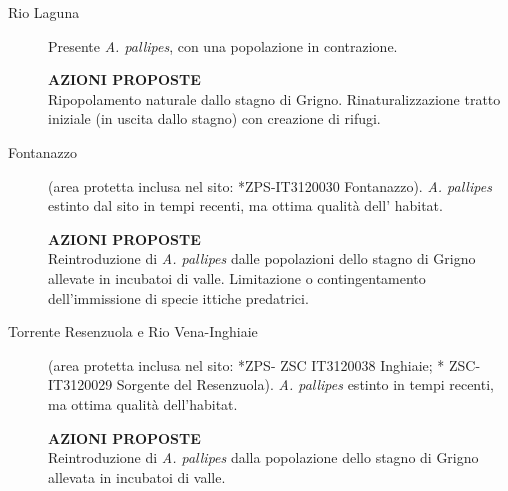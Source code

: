 \documentclass[11pt,a4paper,italian,twoside,openany]{memoir}
\begin{document}
\begin{description}
\item[Rio Laguna] Presente \emph{A. pallipes}, con una popolazione in contrazione.

\textbf{AZIONI PROPOSTE}\\

Ripopolamento naturale dallo stagno di Grigno. Rinaturalizzazione tratto iniziale (in uscita dallo stagno) con creazione di rifugi.

\item[Fontanazzo] (area protetta inclusa nel sito: *ZPS-IT3120030 Fontanazzo). \emph{A. pallipes} estinto dal sito in tempi recenti, ma ottima qualità dell' habitat.

\textbf{AZIONI PROPOSTE}\\

Reintroduzione di \emph{A. pallipes} dalle popolazioni dello stagno di Grigno allevate in incubatoi di valle. Limitazione o contingentamento dell'immissione di specie ittiche predatrici.

\item[Torrente Resenzuola e Rio Vena-Inghiaie] (area protetta inclusa nel sito: *ZPS- ZSC IT3120038 Inghiaie; * ZSC- IT3120029 Sorgente del Resenzuola). \emph{A. pallipes} estinto in tempi recenti, ma ottima qualità dell'habitat.

\textbf{AZIONI PROPOSTE}\\

Reintroduzione di \emph{A. pallipes} dalla popolazione dello stagno di Grigno allevata in incubatoi di valle.
\end{description}
\end{document}
